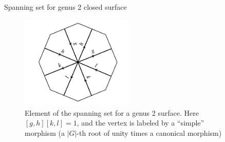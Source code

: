 \documentclass[final,t, mathserif]{beamer}
\theoremstyle{plain}
\theoremstyle{definition}
\begin{document}
\begin{frame}{}
\begin{columns}[t]
\begin{column}{.3\linewidth}



\end{column}
\begin{column}{.3\linewidth}

\begin{block}{Spanning set for genus 2 closed surface}
  \begin{figure}
    \vfill
    \centering
    \includegraphics[width=0.5\textwidth,height=0.8\textheight,keepaspectratio]{g2span}
    \vfill
\caption{Element of the spanning set for a genus 2 surface.  Here $[g,h][k,l] = 1$, and the vertex is labeled by a ``simple'' morphism (a $|G|$-th root of unity times a canonical morphism)}
\label{fig:span}
\end{figure}
\end{block}




\end{column}
\end{columns}
\end{frame}
\end{document}
